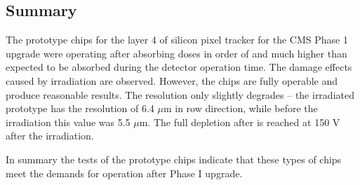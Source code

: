 \subsection{Summary}

The prototype chips for the layer 4 of silicon pixel tracker for the CMS Phase 1 upgrade were operating after absorbing doses in order of and 
much higher than expected to be absorbed during the detector operation time. The damage effects caused by irradiation are observed. However,
the chips are fully operable and produce reasonable results. The resolution only slightly degrades -- the irradiated prototype has the resolution
of 6.4 $\mu$m in row direction, while before the irradiation this value was 5.5 $\mu$m. The full depletion after is reached at 150 V after the
irradiation.

In summary the tests of the prototype chips indicate that these types of chips meet the demands for operation after Phase I upgrade.